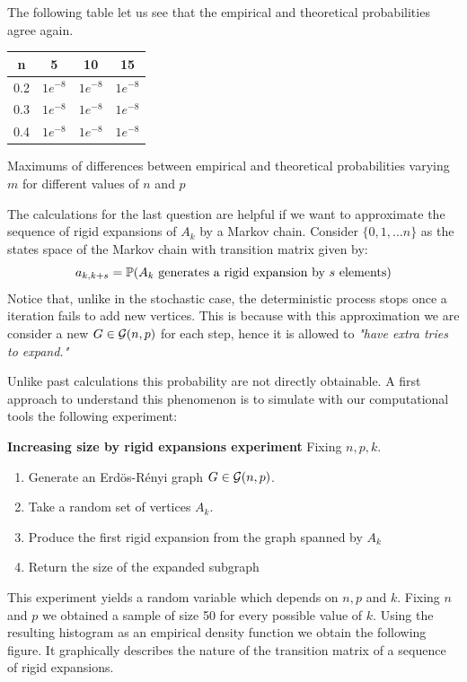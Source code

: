 The following table let us see that the empirical and theoretical probabilities agree again.

\bgroup
\def\arraystretch{1.5}%
\begin{center}
\begin{tabular}{|c|c|c|c|}
\hline
n & 5 & 10 & 15 \\
\hline \hline
 0.2 & $1e^{-8}$ & $1e^{-8}$ & $1e^{-8}$ \\\hline
 0.3 & $1e^{-8}$ & $1e^{-8}$ & $1e^{-8}$ \\\hline
 0.4 & $1e^{-8}$ & $1e^{-8}$ & $1e^{-8}$ \\\hline
\end{tabular}
\caption{Maximums of differences between empirical and theoretical probabilities varying $m$ for different values of $n$ and $p$}
\label{tabla:sencilla}
\end{center}
\bgroup

The calculations for the last question are helpful if we want to approximate the sequence of rigid expansions of $A_{k}$ by a Markov chain. Consider $\{0,1, \dots n\}$ as the states space of the Markov chain with transition matrix given by:
$$ a_{k,k+s} = \P(A_{k} \text{ generates a rigid expansion by } s \text{ elements})$$
Notice that, unlike in the stochastic case, the deterministic process stops once a iteration fails to add new vertices. This is because with this approximation we are consider a new $G \in \G(n,p)$ for each step, hence it is allowed to \textit{"have extra tries to expand."}

Unlike past calculations this probability are not directly obtainable. A first approach to understand this phenomenon is to simulate with our computational tools the following experiment:
 
\begin{cajita}
\textbf{Increasing size by rigid expansions experiment} \hfill \break
Fixing $n,p,k$.
\begin{enumerate}
\item Generate an Erdös-Rényi graph $G\in \G(n,p)$.
\item Take a random set of vertices $A_{k}$.
\item Produce the first rigid expansion from the graph spanned by $A_{k}$
\item Return the size of the expanded subgraph
\end{enumerate}
\end{cajita}

This experiment yields a random variable which depends on $n, p$ and $k$. Fixing $n$ and $p$ we obtained a sample of size 50 for every possible value of $k$. Using the resulting histogram as an empirical density function we obtain the following figure. It graphically describes the nature of the transition matrix of a sequence of rigid expansions.

